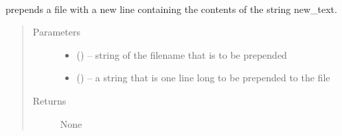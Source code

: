 \documentclass[letterpaper,10pt,english]{sphinxmanual}
\begin{document}
\begin{fulllineitems}
\label{\detokenize{prep:prep.isotropy}}~

\begin{fulllineitems}
\label{\detokenize{prep:prep.isotropy.cif2qe}}
\end{fulllineitems}


\begin{fulllineitems}
\label{\detokenize{prep:prep.isotropy.convert}}
\end{fulllineitems}


\begin{fulllineitems}
\label{\detokenize{prep:prep.isotropy.get_cif}}
\end{fulllineitems}


\end{fulllineitems}


\begin{fulllineitems}
\label{\detokenize{prep:prep.line_prepender}}
prepends a file with a new line containing the contents of the string new\_text.
\begin{quote}\begin{description}
\item[{Parameters}] \leavevmode\begin{itemize}
\item {} 
 () -- string of the filename that is to be prepended

\item {} 
 () -- a string that is one line long to be prepended to the file

\end{itemize}

\item[{Returns}] \leavevmode
None

\end{description}\end{quote}

\end{fulllineitems}
\end{document}
